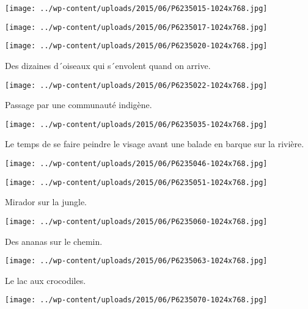  \newline
 \newline
\centerline{\texttt{[image: ../wp-content/uploads/2015/06/P6235015-1024x768.jpg]} } 
 \newline
 \newline
\centerline{\texttt{[image: ../wp-content/uploads/2015/06/P6235017-1024x768.jpg]} } 
 \newline
 \newline
\centerline{\texttt{[image: ../wp-content/uploads/2015/06/P6235020-1024x768.jpg]} } 
 \newline
 Des dizaines d´oiseaux qui s´envolent quand on arrive. \newline
 \newline
\centerline{\texttt{[image: ../wp-content/uploads/2015/06/P6235022-1024x768.jpg]} } 
 \newline
 Passage par une communauté indigène. \newline
 \newline
\centerline{\texttt{[image: ../wp-content/uploads/2015/06/P6235035-1024x768.jpg]} } 
 \newline
 Le temps de se faire peindre le visage avant une balade en barque sur la rivière. \newline
 \newline
\centerline{\texttt{[image: ../wp-content/uploads/2015/06/P6235046-1024x768.jpg]} } 
 \newline
 \newline
\centerline{\texttt{[image: ../wp-content/uploads/2015/06/P6235051-1024x768.jpg]} } 
 \newline
 Mirador sur la jungle. \newline
 \newline
\centerline{\texttt{[image: ../wp-content/uploads/2015/06/P6235060-1024x768.jpg]} } 
 \newline
 Des ananas sur le chemin. \newline
 \newline
\centerline{\texttt{[image: ../wp-content/uploads/2015/06/P6235063-1024x768.jpg]} } 
 \newline
 Le lac aux crocodiles. \newline
 \newline
\centerline{\texttt{[image: ../wp-content/uploads/2015/06/P6235070-1024x768.jpg]} } 
 \newline

